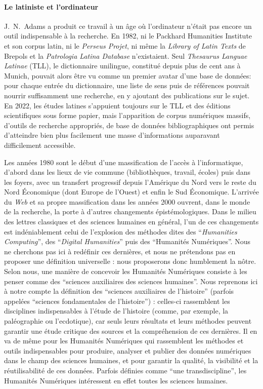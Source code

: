\paragraph{Le latiniste et l'ordinateur}

J.~N.~Adams a produit ce travail à un âge où l'ordinateur n'était pas encore un outil indispensable à la recherche. En 1982, ni le Packhard Humanities Institute et son corpus latin, ni le \textit{Perseus Projet}, ni même la \textit{Library of Latin Texts} de Brepols et la \textit{Patrologia Latina Database} n'existaient. Seul \textit{Thesaurus Languae Latinae} (TLL), le dictionnaire unilingue, constitué depuis plus de cent ans à Munich, pouvait alors être vu comme un premier avatar d'une base de données: pour chaque entrée du dictionnaire, une liste de sens puis de références pouvait nourrir suffisamment une recherche, en y ajoutant des publications sur le sujet. En 2022, les études latines s'appuient toujours sur le TLL et des éditions scientifiques sous forme papier, mais l'apparition de corpus numériques massifs, d'outils de recherche appropriés, de base de données bibliographiques ont permis d'atteindre bien plus facilement une masse d'informations auparavant difficilement accessible.

Les années 1980 sont le début d'une massification de l'accès à l'informatique, d'abord dans les lieux de vie commune (bibliothèques, travail, écoles) puis dans les foyers, avec un transfert progressif depuis l'Amérique du Nord vers le reste du Nord Économique (dont Europe de l'Ouest) et enfin le Sud Économique. L'arrivée du \textit{Web} et sa propre massification dans les années 2000 ouvrent, dans le monde de la recherche, la porte à d'autres changements épistémologiques. Dans le milieu des lettres classiques et des sciences humaines en général, l'un de ces changements est indéniablement celui de l'explosion des méthodes dites des \enquote{\textit{Humanities Computing}}, des \enquote{\textit{Digital Humanities}} puis des \enquote{Humanités Numériques}. Nous ne cherchons pas ici à redéfinir ces dernières, et nous ne prétendons pas en proposer une définition universelle : nous proposerons donc humblement la nôtre. Selon nous, une manière de concevoir les Humanités Numériques consiste à les penser comme des \enquote{sciences auxiliaires des sciences humaines}. Nous reprenons ici à notre compte la définition des \enquote{sciences auxiliaires de l'histoire} (parfois appelées \enquote{sciences fondamentales de l'histoire}) : celles-ci rassemblent les disciplines indispensables à l'étude de l'histoire (comme, par exemple, la paléographie ou l'ecdotique), car seuls leurs résultats et leurs méthodes peuvent garantir une étude critique des sources et la compréhension de ces dernières. Il en va de même pour les Humanités Numériques qui rassemblent les méthodes et outils indispensables pour produire, analyser et publier des données numériques dans le champ des sciences humaines, et pour garantir la qualité, la visibilité et la réutilisabilité de ces données. Parfois définies comme \enquote{une transdiscipline}, 
les Humanités Numériques intéressent en effet toutes les sciences humaines. 

